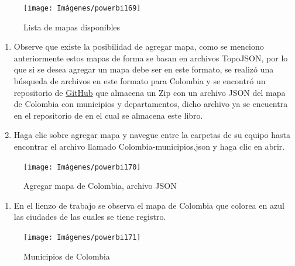 \documentclass[
]{book}
\providecommand{\tightlist}{%
  \setlength{\itemsep}{0pt}\setlength{\parskip}{0pt}}
\begin{document}
\begin{figure}

{\centering \texttt{[image: Imágenes/powerbi169]} 

}

\caption{Lista de mapas disponibles}\label{fig:paso4mapadeformas-fig}
\end{figure}

\begin{enumerate}
\def\labelenumi{\arabic{enumi}.}
\setcounter{enumi}{4}
\item
  Observe que existe la posibilidad de agregar mapa, como se menciono anteriormente estos mapas de forma se basan en archivos TopoJSON, por lo que si se desea agregar un mapa debe ser en este formato, se realizó una búsqueda de archivos en este formato para Colombia y se encontró un repositorio de \href{https://gist.github.com/john-guerra/727e8992e9599b9d9f1dbfdc4c8e479e}{GitHub} que almacena un Zip con un archivo JSON del mapa de Colombia con municipios y departamentos, dicho archivo ya se encuentra en el repositorio de en el cual se almacena este libro.
\item
  Haga clic sobre agregar mapa y navegue entre la carpetas de su equipo hasta encontrar el archivo llamado Colombia-municipios.json y haga clic en abrir.
\end{enumerate}

\begin{figure}

{\centering \texttt{[image: Imágenes/powerbi170]} 

}

\caption{Agregar mapa de Colombia, archivo JSON}\label{fig:paso6mapadeformas-fig}
\end{figure}

\begin{enumerate}
\def\labelenumi{\arabic{enumi}.}
\setcounter{enumi}{6}
\tightlist
\item
  En el lienzo de trabajo se observa el mapa de Colombia que colorea en azul las ciudades de las cuales se tiene registro.
\end{enumerate}

\begin{figure}

{\centering \texttt{[image: Imágenes/powerbi171]} 

}

\caption{Municipios de Colombia}\label{fig:paso7mapadeformas-fig}
\end{figure}
\end{document}
